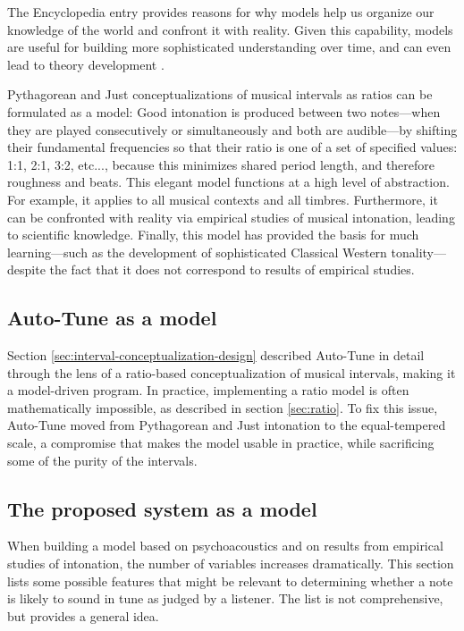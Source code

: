 The Encyclopedia entry provides reasons for why models help us organize our knowledge of the world and confront it with reality. Given this capability, models are useful for building more sophisticated understanding over time, and can even lead to theory development \cite{sep-models-science}.

Pythagorean and Just conceptualizations of musical intervals as ratios can be formulated as a model: Good intonation is produced between two notes---when they are played consecutively or simultaneously and both are audible---by shifting their fundamental frequencies so that their ratio is one of a set of specified values: 1:1, 2:1, 3:2, etc..., because this minimizes shared period length, and therefore roughness and beats. This elegant model functions at a high level of abstraction. For example, it applies to all musical contexts and all timbres. Furthermore, it can be confronted with reality via empirical studies of musical intonation, leading to scientific knowledge. Finally, this model has provided the basis for much learning---such as the development of sophisticated Classical Western tonality---despite the fact that it does not correspond to results of empirical studies. 

\subsection{Auto-Tune as a model}
Section \ref{sec:interval-conceptualization-design} described Auto-Tune in detail through the lens of a ratio-based conceptualization of musical intervals, making it a model-driven program. In practice, implementing a ratio model is often mathematically impossible, as described in section \ref{sec:ratio}. To fix this issue, Auto-Tune moved from Pythagorean and Just intonation to the equal-tempered scale, a compromise that makes the model usable in practice, while sacrificing some of the purity of the intervals.

\subsection{The proposed system as a model}
\label{sec:proposed-as-model}
When building a model based on psychoacoustics and on results from empirical studies of intonation, the number of variables increases dramatically. This section lists some possible features that might be relevant to determining whether a note is likely to sound in tune as judged by a listener. The list is not comprehensive, but provides a general idea.

